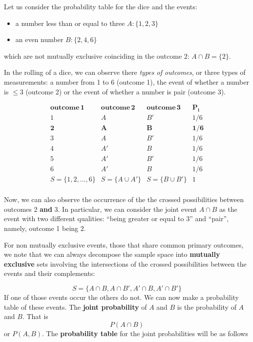 \documentclass[
]{book}
\begin{document}
Let us consider the probability table for the dice and the events:

\begin{itemize}
\item
  a number less than or equal to three \(A:\{ 1,2,3\}\)
\item
  an even number \(B:\{ 2,4,6\}\)
\end{itemize}

which are not mutually exclusive coinciding in the outcome \(2\): \(A \cap B = \{2\}\).

In the rolling of a dice, we can observe there \emph{types of outcomes}, or three types of measurements: a number from 1 to 6 (outcome 1), the event of whether a number is \(\leq 3\) (outcome 2) or the event of whether a number is pair (outcome 3).

\[
\begin{array}{cccc}
\mathbf{outcome\, 1} & \mathbf{outcome\, 2} & \mathbf{outcome\, 3}  & \mathbf{P_i} \\
1 & A & B' & 1/6 \\
\mathbf{2} & \mathbf{A} & \mathbf{B} & \mathbf{1/6} \\
3 & A & B' & 1/6 \\
4 & A'& B & 1/6 \\
5 & A'& B' & 1/6 \\
6 & A'& B & 1/6 \\ \hline
S=\{1, 2, ... ,6\} & S=\{A \cup A'\} & S=\{B \cup B'\} & 1 \\ 
\end{array}
\]

Now, we can also observe the occurrence of the the crossed possibilities between outcomes 2 \textbf{and} 3. In particular, we can consider the joint event \(A\cap B\) as the event with two different qualities: ``being greater or equal to 3'' and ``pair'', namely, outcome 1 being \(2\).

For non mutually exclusive events, those that share common primary outcomes, we note that we can always decompose the sample space into \textbf{mutually exclusive} sets involving the intersections of the crossed possibilities between the events and their complements:

\[S=\{A\cap B, A \cap B', A'\cap B, A'\cap B'\}\]
If one of those events occur the others do not. We can now make a probability table of these events. The \textbf{joint probability} of \(A\) and \(B\) is the probability of \(A\) and \(B\). That is \[P( A \cap B)\] or \(P(A,B)\). The \textbf{probability table} for the joint probabilities will be as follows
\end{document}
